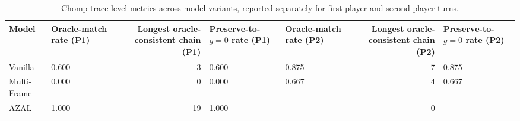 \begin{table}[t]
\centering
\caption{Chomp trace-level metrics across model variants, reported separately for first-player and second-player turns.}
\label{tab:chomp_trace_metrics}
\begin{tabular}{llrllrl}
\toprule
Model & Oracle-match rate (P1) & Longest oracle-consistent chain (P1) & Preserve-to-$g=0$ rate (P1) & Oracle-match rate (P2) & Longest oracle-consistent chain (P2) & Preserve-to-$g=0$ rate (P2) \\
\midrule
Vanilla & 0.600 & 3 & 0.600 & 0.875 & 7 & 0.875 \\
Multi-Frame & 0.000 & 0 & 0.000 & 0.667 & 4 & 0.667 \\
AZAL & 1.000 & 19 & 1.000 &  & 0 &  \\
\bottomrule
\end{tabular}
\end{table}
